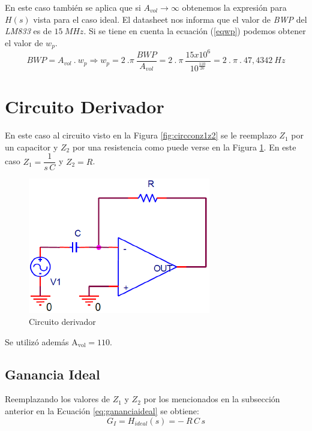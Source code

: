 En este caso también se aplica que si $A_{vol} \longrightarrow \infty$ obtenemos la expresión para $H(s)$ vista para el caso ideal.
El datasheet nos informa que el valor de \textit{BWP} del \textit{LM833} es de $15 \ MHz$.
Si se tiene en cuenta la ecuación (\ref{eqwp}) podemos obtener el valor de $w_p$.
\begin{equation}\label{eqwp}
BWP = A_{vol} \ . \ w_p \Rightarrow w_p= 2 \ . \pi \ \frac{BWP}{A_{vol}}= 2 \ . \ \pi \ \frac{15x10^6}{10^{\frac{110}{20}}} = 2 \ . \ \pi \ . \ 47,4342 \ Hz
\end{equation}















\section{Circuito Derivador}
En este caso al circuito visto en la Figura \ref{fig:circconz1z2} se le reemplazo $Z_1$ por un capacitor y $Z_2$ por una resistencia como puede verse en la Figura \ref{fig:circuitoderivador}. En este caso $Z_1=\dfrac{1}{s \, C}$ y $Z_2= R$.
\begin{figure}[H]
\centering
\includegraphics[scale=0.5]{../Ex4/circuitoderivador.png}
\caption{Circuito derivador}
\label{fig:circuitoderivador}
\end{figure}

Se utilizó además $\mathrm{A_{vol}}=110$.

\subsection{Ganancia Ideal}
Reemplazando los valores de $Z_1$ y $Z_2$ por los mencionados en la subsección anterior en la Ecuación \ref{eq:gananciaideal} se obtiene:
\begin{equation}
G_I=H_{ideal}(s)= - \ R \,C \,s
\end{equation}


